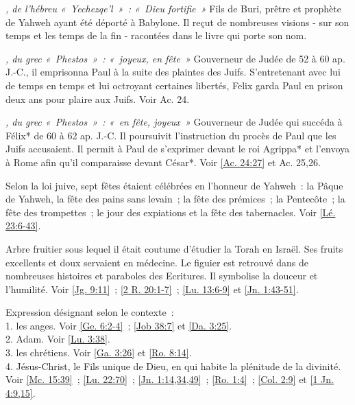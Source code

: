 \begin{multicols}{2}
\textit{, de l'hébreu «~Yechezqe'l~»~: «~Dieu fortifie~»}\newline
Fils de Buri, prêtre et prophète de Yahweh ayant été déporté à Babylone. Il reçut de nombreuses visions - sur son temps et les temps de la fin - racontées dans le livre qui porte son nom.

\textit{, du grec «~Phestos~»~: «~joyeux, en fête~»}\newline
Gouverneur de Judée de 52 à 60 ap. J.-C., il emprisonna Paul à la suite des plaintes des Juifs. S'entretenant avec lui de temps en temps et lui octroyant certaines libertés, Felix garda Paul en prison deux ans pour plaire aux Juifs. Voir Ac. 24.

\textit{, du grec «~Phestos~»~: «~en fête, joyeux~»}\newline
Gouverneur de Judée qui succéda à Félix* de 60 à 62 ap. J.-C. Il poursuivit l'instruction du procès de Paul que les Juifs accusaient. Il permit à Paul de s'exprimer devant le roi Agrippa* et l'envoya à Rome afin qu'il comparaisse devant César*. Voir \vref{Ac. 24:27} et Ac. 25,26.

\textit{}\newline
Selon la loi juive, sept fêtes étaient célébrées en l'honneur de Yahweh~: la Pâque de Yahweh, la fête des pains sans levain~; la fête des prémices~; la Pentecôte~; la fête des trompettes~; le jour des expiations et la fête des tabernacles. Voir \vref{Lé. 23:6-43}.

\textit{}\newline
Arbre fruitier sous lequel il était coutume d'étudier la Torah en Israël. Ses fruits excellents et doux servaient en médecine. Le figuier est retrouvé dans de nombreuses histoires et paraboles des Ecritures. Il symbolise la douceur et l'humilité. Voir \vref{Jg. 9:11}~; \vref{2 R. 20:1-7}~; \vref{Lu. 13:6-9} et \vref{Jn. 1:43-51}.

\textit{}\newline
Expression désignant selon le contexte~:
\\1. les anges. Voir \vref{Ge. 6:2-4}~; \vref{Job 38:7} et \vref{Da. 3:25}.
\\2. Adam. Voir \vref{Lu. 3:38}.
\\3. les chrétiens. Voir \vref{Ga. 3:26} et \vref{Ro. 8:14}.
\\4. Jésus-Christ, le Fils unique de Dieu, en qui habite la plénitude de la divinité. Voir \vref{Mc. 15:39}~; \vref{Lu. 22:70}~; \vref{Jn. 1:14,34,49}~; \vref{Ro. 1:4}~; \vref{Col. 2:9} et \vref{1 Jn. 4:9,15}.


\end{multicols}
